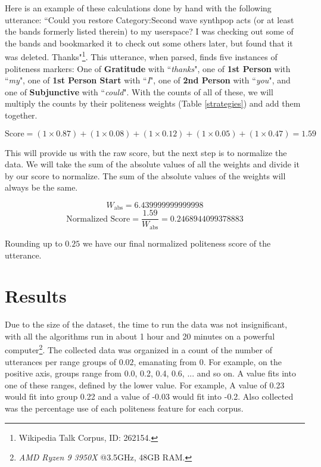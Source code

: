 \documentclass{article}
\begin{document}
Here is an example of these calculations done by hand with the following utterance: ``Could you restore Category:Second wave synthpop acts (or at least the bands formerly listed therein) to my userspace? I was checking out some of the bands and bookmarked it to check out some others later, but found that it was deleted. Thanks"\footnote{Wikipedia Talk Corpus, ID: 262154.}. This utterance, when parsed, finds five instances of politeness markers: One of \textbf{Gratitude} with ``\textit{thanks}", one of \textbf{1st Person} with ``\textit{my}", one of \textbf{1st Person Start} with ``\textit{I}", one of \textbf{2nd Person} with ``\textit{you}", and one of \textbf{Subjunctive} with ``\textit{could}". With the counts of all of these, we will multiply the counts by their politeness weights (Table \ref{strategies}) and add them together.

\[
\text{Score} = (1 \times 0.87) + (1 \times 0.08) + (1 \times 0.12) + (1 \times 0.05) + (1 \times 0.47) = 1.59
\]

This will provide us with the raw score, but the next step is to normalize the data. We will take the sum of the absolute values of all the weights and divide it by our score to normalize. The sum of the absolute values of the weights will always be the same.

\[
W_{\text{abs}} = 6.439999999999998
\]
\[
\text{Normalized Score} = \frac{1.59}{W_{\text{abs}}} = 0.2468944099378883
\]

Rounding up to $0.25$ we have our final normalized politeness score of the utterance.


\section{Results}
Due to the size of the dataset, the time to run the data was not insignificant, with all the algorithms run in about 1 hour and 20 minutes on a powerful computer\footnote{\textit{AMD Ryzen 9 3950X} @3.5GHz, 48GB RAM.}. The collected data was organized in a count of the number of utterances per range groups of $0.02$, emanating from $0$. For example, on the positive axis, groups range from 0.0, 0.2, 0.4, 0.6, ... and so on. A value fits into one of these ranges, defined by the lower value. For example, A value of 0.23 would fit into group 0.22 and a value of -0.03 would fit into -0.2. Also collected was the percentage use of each politeness feature for each corpus.
\end{document}

